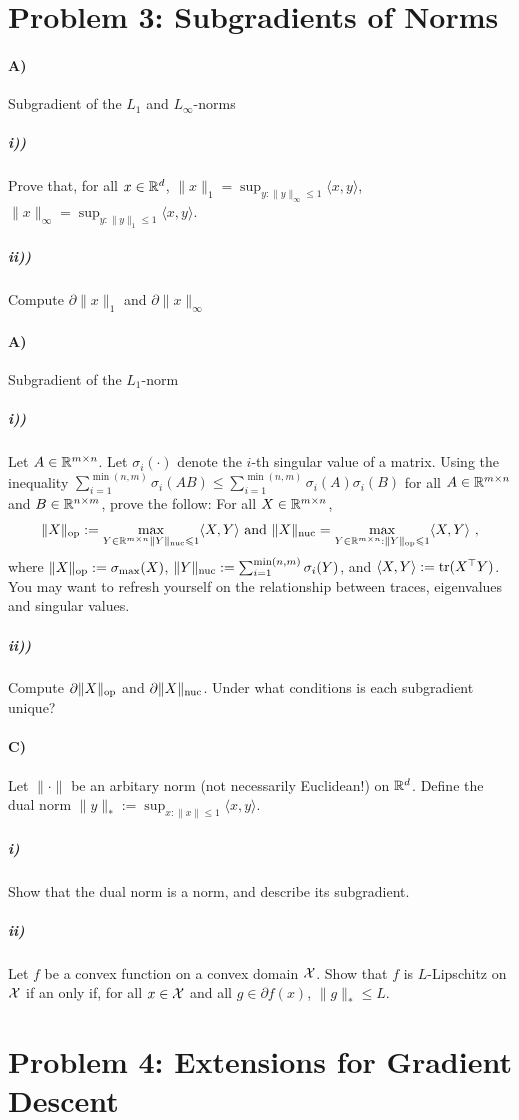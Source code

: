 \documentclass[12pt]{article}
\begin{document}
\section*{Problem 3: Subgradients of Norms}
\paragraph{A)} Subgradient of the $L_1$ and $L_{\infty}$-norms
\subparagraph{i))} Prove that, for all $x \in \mathbb{R}^d$, $\|x\|_1 = \sup_{y: \|y\|_{\infty} \le 1}\langle x, y \rangle$, $\|x\|_{\infty} = \sup_{y:\|y\|_1 \le 1}\langle x, y \rangle$. 
\subparagraph{ii))} Compute $\partial \|x\|_1$ and $\partial \|x\|_{\infty}$
\paragraph{A)} Subgradient of the $L_1$-norm
\subparagraph{i))} Let $A \in \mathbb{R}^{m \times n}$. Let $\sigma_i(\cdot)$ denote the $i$-th singular value of a matrix. Using the inequality $\sum_{i=1}^{\min(n,m)}\sigma_i(AB) \le \sum_{i=1}^{\min(n,m)} \sigma_i(A)\sigma_i(B)$ for all $A \in \mathbb{R}^{m \times n}$ and $B \in \mathbb{R}^{n \times m}$, prove the follow: For all $X \in \mathbb{R}^{m \times n}$, 
\begin{eqnarray}
\|X\|_{\mathrm{op}} :=  \max_{Y \in \mathbb{R}^{m \times n}  \|Y\|_{\mathrm{nuc}} \leqslant 1} \langle X, Y \rangle  \text{ and } \|X\|_{\mathrm{nuc}} =  \max_{Y \in \mathbb{R}^{m \times n} :\|Y\|_{\mathrm{op}} \leqslant 1} \langle X, Y \rangle ~,
\end{eqnarray}
where $\|X\|_{\mathrm{op}} := \sigma_{\max}(X)$, $ \|Y\|_{\mathrm{nuc}} := \sum_{i=1}^{\min(n,m)} \sigma_i(Y)$, and $\langle X, Y \rangle := \mathrm{tr}(X^\top Y)$. You may want to refresh yourself on the relationship between traces, eigenvalues and singular values. 
\subparagraph{ii))} Compute $\partial \|X\|_{\mathrm{op}}$ and $\partial \|X\|_{\mathrm{nuc}}$. Under what conditions is each subgradient unique?
\paragraph{C)} Let  $\|\cdot\|$ be an arbitary norm (not necessarily Euclidean!) on $\mathbb{R}^d$. Define the dual norm $\|y\|_* := \sup_{x: \|x\| \le 1}\langle x,y \rangle$. 
\subparagraph{i)} Show that the dual norm is a norm, and describe its subgradient.
\subparagraph{ii)} Let $f$ be a convex function on a convex domain ${\cal X}$. Show that $f$ is $L$-Lipschitz on ${\cal X}$ if an only if, for all $x \in {\cal X}$ and all $g \in \partial f(x)$, $\|g\|_{*} \le L$. 


\section*{Problem 4: Extensions for Gradient Descent}
\end{document}
